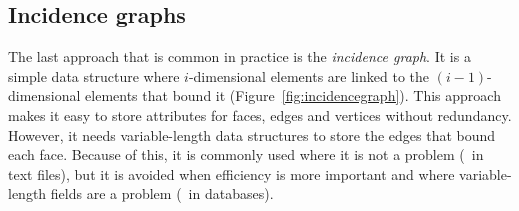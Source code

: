 \subsection{Incidence graphs}

The last approach that is common in practice is the \emph{incidence graph}.
It is a simple data structure where \(i\)-dimensional elements are linked to the \((i-1)\)-dimensional elements that bound it (Figure~\ref{fig:incidencegraph}).
This approach makes it easy to store attributes for faces, edges and vertices without redundancy.
However, it needs variable-length data structures to store the edges that bound each face.
Because of this, it is commonly used where it is not a problem (\eg\ in text files), but it is avoided when efficiency is more important and where variable-length fields are a problem (\eg\ in databases).

